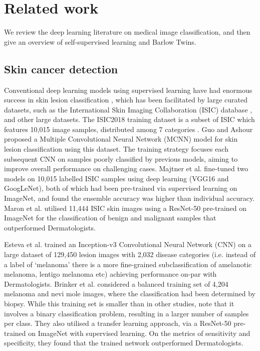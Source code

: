 \documentclass[a4paper,fleqn]{cas-dc}
\begin{document}
\section{Related work}

We review the deep learning literature on medical image classification, and then give an overview of self-supervised learning and Barlow Twins.


\subsection{Skin cancer  detection}
\label{sec:cancer_lit} 

Conventional deep learning models using supervised learning have had enormous success in skin lesion classification \cite{dildar2021skin}, which has been facilitated by large curated datasets, such as the International Skin Imaging Collaboration (ISIC) database \cite{ISIC2023}, and other large datasets. The ISIC2018 training dataset is a subset of ISIC which features 10,015 image samples, distributed among 7 categories \cite{isic2018}. Guo and Ashour \cite{guo2018multiple} proposed a Multiple Convolutional Neural Network (MCNN) model for skin lesion classification using this dataset.   The training strategy focuses each subsequent CNN on samples poorly classified by previous models, aiming to improve overall performance on challenging cases. Majtner et al. \cite{majtner2018ensemble} fine-tuned two models on 10,015 labelled ISIC samples using deep learning (VGG16 and GoogLeNet), both of which had been pre-trained via supervised learning on ImageNet, and found the ensemble accuracy was higher than individual accuracy. Maron et al. \cite{MARON201957} utilised  11,444 ISIC skin images using a ResNet-50 pre-trained on ImageNet for the classification of benign and malignant samples that outperformed Dermatologists.

Esteva et al. \cite{esteva2017dermatologist} trained an Inception-v3 Convolutional Neural Network (CNN) on a large dataset of 129,450 lesion images with 2,032 disease categories (i.e. instead of a label of `melanoma' there is a more fine-grained subclassification of amelanotic melanoma, lentigo melanoma etc) achieving performance on-par with Dermatologists.  Brinker et al. \cite{brinker2019deep} considered a balanced training set of 4,204 melanoma and nevi mole images, where the classification had been determined by biopsy. While this training set is smaller than in other studies, note that it involves a binary classification problem, resulting in a larger number of samples per class. They also utilised a transfer learning approach, via a ResNet-50 pre-trained on ImageNet with supervised learning. On the metrics of sensitivity and specificity, they found that the trained network outperformed Dermatologists. 
\end{document}
